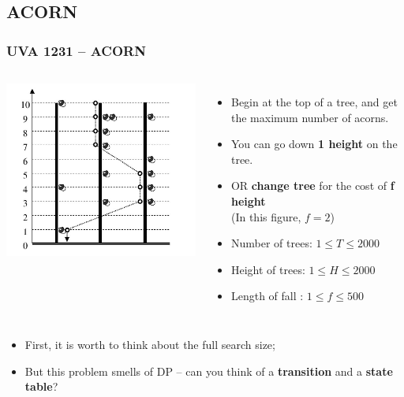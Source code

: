 \subsection{ACORN}
\begin{frame}
  \frametitle{UVA 1231 -- ACORN}

  \begin{columns}
    \includegraphics[width=1\textwidth]{img/acorn}

    \begin{itemize}
    \item Begin at the top of a tree, and get the maximum number of acorns.
    \item You can go down {\bf 1 height} on the tree.
    \item OR {\bf change tree} for the cost of {\bf f height}\\
      (In this figure, $f = 2$)

      \bigskip

    \item Number of trees: $ 1 \leq T \leq 2000$
    \item Height of trees: $ 1 \leq H \leq 2000$
    \item Length of fall : $ 1 \leq f \leq 500$
    \end{itemize}
  \end{columns}

  \begin{block}{}
    \begin{itemize}
      \item First, it is worth to think about the full search size;
      \item But this problem smells of DP -- can you think of a {\bf transition} and a {\bf state table}?
    \end{itemize}
  \end{block}
\end{frame}

